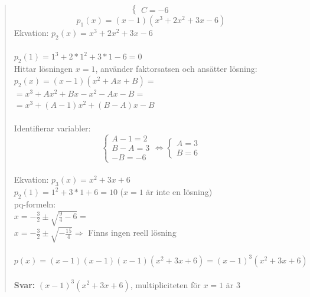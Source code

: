 \documentclass[a4paper]{article}
\begin{document}
\begin{quotation}
\[\begin{cases}
		C=-6
		\end{cases}\]
		\[p_1(x)=(x-1)(x^3+2x^2+3x-6)\]
		Ekvation: $p_2(x)=x^3+2x^2+3x-6$ \\ \\
		$p_2(1)=1^3+2*1^2+3*1-6=0$ \\
		Hittar lösningen $x=1$, använder faktorsatsen och ansätter lösning: \\
		$p_2(x)=(x-1)(x^2+Ax+B)=$ \\
		$=x^3+Ax^2+Bx-x^2-Ax-B=$ \\
		$=x^3+(A-1)x^2+(B-A)x-B$ \\ \\
		Identifierar variabler: \\
		\[\begin{cases} 
		A-1=2 \\ 
		B-A=3 \\ 
		-B=-6 
		\end{cases}
		\Leftrightarrow
		\begin{cases} 
		A=3 \\ 
		B=6
		\end{cases}\]
		\\
		Ekvation: $p_3(x)=x^2+3x+6$ \\
		$p_2(1)=1^2+3*1+6=10$ ($x=1$ är inte en lösning) \\
		pq-formeln: \\
		$x=-\frac{3}{2}\pm\sqrt{\frac{9}{4}-6}=$ \\
		$x=-\frac{3}{2}\pm\sqrt{-\frac{15}{4}} \Rightarrow$ Finns ingen reell lösning \\ \\
		$p(x)=(x-1)(x-1)(x-1)(x^2+3x+6)=(x-1)^3(x^2+3x+6)$ 
		\\ \\
		\textbf{Svar:} $(x-1)^3(x^2+3x+6)$, multipliciteten för $x=1$ är 3
	\end{quotation}
	
\end{document}
